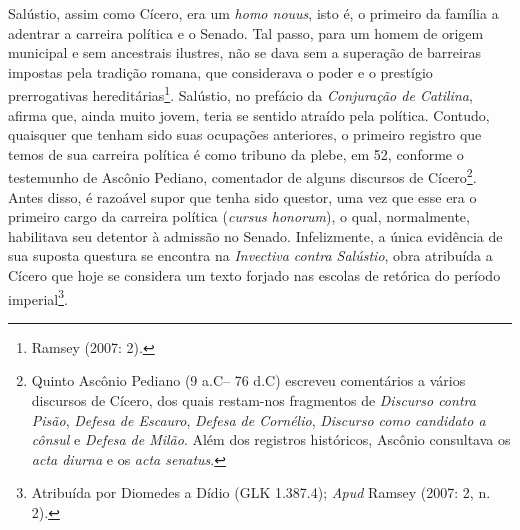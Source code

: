 Salústio, assim como Cícero, era um \emph{homo nouus}, isto é, o primeiro da
família a adentrar a carreira política e o Senado. Tal passo, para um homem de origem
municipal e sem ancestrais ilustres, não se dava sem a superação de barreiras
impostas pela tradição romana, que considerava o poder e o prestígio
prerrogativas hereditárias\footnote{Ramsey (2007: 2).}.  Salústio, no prefácio
da \emph{Conjuração de Catilina}, afirma que, ainda muito jovem, teria se
sentido atraído pela política. Contudo, quaisquer que tenham sido suas
ocupações anteriores, o primeiro registro que temos de sua carreira política é
como tribuno da plebe, em 52,  conforme o testemunho de Ascônio Pediano,
comentador de alguns discursos de Cícero\footnote{Quinto Ascônio Pediano (9
a.C-- 76 d.C) escreveu comentários a vários discursos de Cícero, dos quais
restam-nos fragmentos de \emph{Discurso contra Pisão}, \emph{Defesa de Escauro}, \emph{Defesa de Cornélio}, \emph{Discurso como candidato a cônsul} e \emph{Defesa de Milão}. Além dos registros históricos, Ascônio consultava os
\emph{acta diurna} e os \emph{acta senatus}.}. Antes disso, é razoável supor que tenha
sido questor, uma vez que esse era o primeiro cargo da carreira política
(\emph{cursus honorum}), o qual, normalmente, habilitava seu detentor à
admissão no Senado. Infelizmente, a única evidência de sua suposta questura se
encontra na \emph{Invectiva contra Salústio}, obra atribuída a Cícero que hoje
se considera um texto forjado nas escolas de retórica do período
imperial\footnote{Atribuída por
Diomedes a Dídio (GLK 1.387.4); \emph{Apud} Ramsey  (2007: 2, n. 2).}.   

